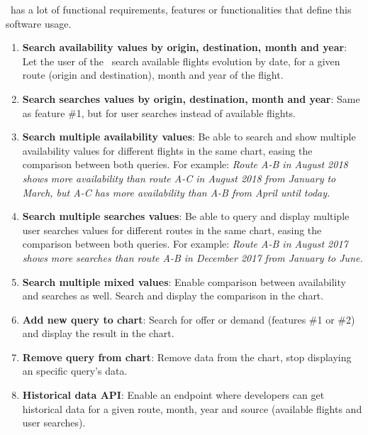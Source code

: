 \thesis\ has a lot of functional requirements, features or functionalities that define this software usage. 

\begin{enumerate}
    \item \textbf{Search availability values by origin, destination, month and year}: Let the user of the \thesis\ search available flights evolution by date, for a given route (origin and destination), month and year of the flight.
    \\
    \item \textbf{Search searches values by origin, destination, month and year}: Same as feature \#1, but for user searches instead of available flights.
    \\
    \item \textbf{Search multiple availability values}: Be able to search and show multiple availability values for different flights in the same chart, easing the comparison between both queries. For example: \textit{Route A-B in August 2018 shows more availability than route A-C in August 2018 from January to March, but A-C has more availability than A-B from April until today.}
    \\
    \item \textbf{Search multiple searches values}: Be able to query and display multiple user searches values for different routes in the same chart, easing the comparison between both queries. For example: \textit{Route A-B in August 2017 shows more searches than route A-B in December 2017 from January to June.}
    \\
    \item \textbf{Search multiple mixed values}: Enable comparison between availability and searches as well. Search and display the comparison in the chart.
    \\
    \item \textbf{Add new query to chart}: Search for offer or demand (features \#1 or \#2) and display the result in the chart.
    \\
    \item \textbf{Remove query from chart}: Remove data from the chart, stop displaying an specific query's data.
    \\
    \item \textbf{Historical data API}: Enable an endpoint where developers can get historical data for a given route, month, year and source (available flights and user searches).
\end{enumerate}

